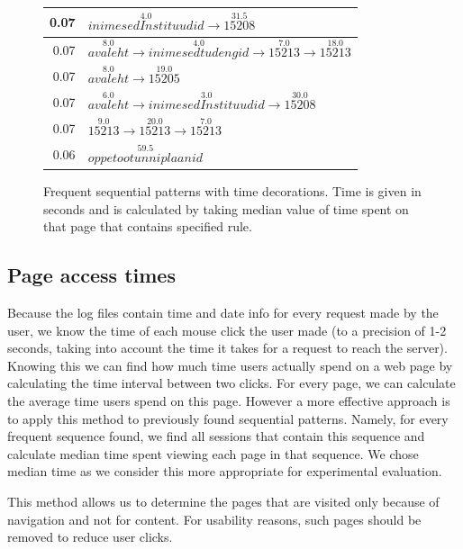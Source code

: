 \documentclass[12pt, english,a4paper]{article}
\begin{document}
\begin{figure}[H]
\begin{tabular}{ r | l }
0.07 & $ \overset{4.0}{inimesedInstituudid} \rightarrow \overset{31.5}{15208} $ \\ \hline
0.07 & $ \overset{8.0}{avaleht} \rightarrow \overset{4.0}{inimesedtudengid} \rightarrow \overset{7.0}{15213} \rightarrow \overset{18.0}{15213} $ \\ \hline
0.07 & $ \overset{8.0}{avaleht} \rightarrow \overset{19.0}{15205} $ \\ \hline
0.07 & $ \overset{6.0}{avaleht} \rightarrow \overset{3.0}{inimesedInstituudid} \rightarrow \overset{30.0}{15208} $ \\ \hline
0.07 & $ \overset{9.0}{15213} \rightarrow \overset{20.0}{15213} \rightarrow \overset{7.0}{15213} $ \\ \hline
0.06 & $ \overset{59.5}{oppetootunniplaanid} $ \\ \hline
\end{tabular}
  \caption{Frequent sequential patterns with time decorations. Time is given in seconds and is calculated by taking median value of time spent on that page that contains specified rule. }
  \label{frequent_patterns}
\end{figure}



\subsection{Page access times}
Because the log files contain time and date info for every request made by the user, we know the time of each mouse click the user made (to a precision of 1-2 seconds, taking into account the time it takes for a request to reach the server). Knowing this we can find how much time users actually spend on a web page by calculating the time interval between two clicks. For every page, we can calculate the average time users spend on this page. However a more effective approach is to apply this method to previously found sequential patterns. Namely, for every frequent sequence found, we find all sessions that contain this sequence and calculate median time spent viewing each page in that sequence. We chose median time as we consider this more appropriate for experimental evaluation.

This method allows us to determine the pages that are visited only because of navigation and not for content. For usability reasons, such pages should be removed to reduce user clicks.
\end{document}
